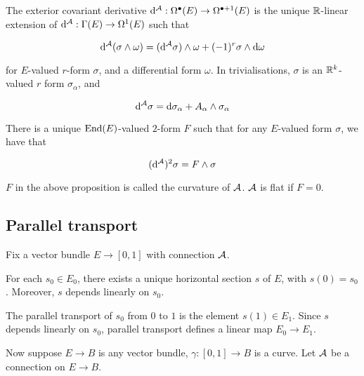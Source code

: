 \begin{definition}
     The exterior covariant derivative \(\dd^{\mathcal{A}} : \Omega^\bullet(E) \to \Omega^{\bullet + 1}(E)\) is the unique \(\mathbb{R}\)-linear extension of \(\dd^{\mathcal{A}} : \Gamma(E) \to \Omega^1(E)\) such that

    \[\dd^{\mathcal{A}}(\sigma \wedge \omega) = (\dd^{\mathcal{A}} \sigma)\wedge \omega + (-1)^r\sigma \wedge \dd\omega\]

    for \(E\)-valued \(r\)-form \(\sigma\), and a differential form \(\omega\). In trivialisations, \(\sigma\) is an \(\mathbb{R}^k\)-valued \(r\) form \(\sigma_\alpha\), and 

    \[\dd^{\mathcal{A}}\sigma = \dd \sigma_\alpha + A_\alpha \wedge \sigma_\alpha\]
\end{definition}

\begin{proposition}
    There is a unique \(\operatorname{End}(E)\)-valued \(2\)-form \(F\) such that for any \(E\)-valued form \(\sigma\), we have that

    \[(\dd^{\mathcal{A}})^2\sigma = F\wedge\sigma\]
\end{proposition}

\begin{definition}
    [curvature]

    \(F\) in the above proposition is called the curvature of \(\mathcal{A}\). \(\mathcal{A}\) is flat if \(F = 0\).
\end{definition}

\subsection{Parallel transport}

Fix a vector bundle \(E \to [0, 1]\) with connection \(\mathcal{A}\).

\begin{lemma}
    For each \(s_0 \in E_0\), there exists a unique horizontal section \(s\) of \(E\), with \(s(0) = s_0\). Moreover, \(s\) depends linearly on \(s_0\).
\end{lemma}

\begin{definition}
     The parallel transport of \(s_0\) from \(0\) to \(1\) is the element \(s(1) \in E_1\). Since \(s\) depends linearly on \(s_0\), parallel transport defines a linear map \(E_0 \to E_1\).
\end{definition}

Now suppose \(E \to B\) is any vector bundle, \(\gamma : [0, 1] \to B\) is a curve. Let \(\mathcal{A}\) be a connection on \(E \to B\).

